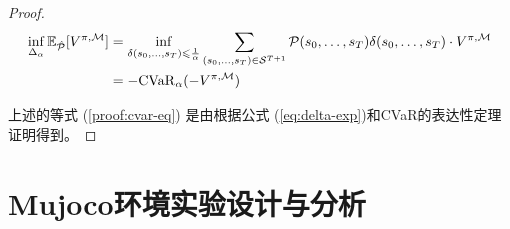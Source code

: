 \begin{proof}
\begin{align}
    \inf\limits_{\Delta_\alpha}\mathbb{E}_{\hat{\mathcal{P}}}[V^{\pi,\mathcal{M}}] &= \inf\limits_{\delta(s_0,\ldots,s_T)\leq\frac{1}{\alpha}}\sum_{(s_0,\ldots,s_T)\in\mathcal{S}^{T+1}}\mathcal{P}(s_0,\ldots,s_T)\delta(s_0,\ldots,s_T)\cdot V^{\pi,\mathcal{M}}\notag\\
    &=-\mathrm{CVaR}_\alpha(-V^{\pi,\mathcal{M}})\label{proof:cvar-eq}
\end{align}

上述的等式 (\ref{proof:cvar-eq}) 是由根据公式 (\ref{eq:delta-exp})和CVaR的表达性定理证明得到。

\end{proof}

\section{Mujoco环境实验设计与分析}

